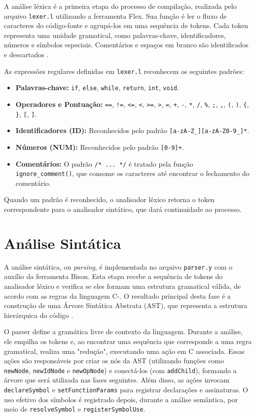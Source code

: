 \documentclass[
	12pt,				%
	oneside,
	a4paper,			%
	english,			%
	french,				%
	spanish,			%
	brazil,				%
	]{abntex2}
\begin{document}
A análise léxica é a primeira etapa do processo de compilação, realizada pelo arquivo \texttt{lexer.l} utilizando a ferramenta Flex. Sua função é ler o fluxo de caracteres do código-fonte e agrupá-los em uma sequência de tokens. Cada token representa uma unidade gramatical, como palavras-chave, identificadores, números e símbolos especiais. Comentários e espaços em branco são identificados e descartados \cite{compiladoresLouden}.

As expressões regulares definidas em \texttt{lexer.l} reconhecem os seguintes padrões:
\begin{itemize}
    \item \textbf{Palavras-chave:} \texttt{if}, \texttt{else}, \texttt{while}, \texttt{return}, \texttt{int}, \texttt{void}.
    \item \textbf{Operadores e Pontuação:} \texttt{==}, \texttt{!=}, \texttt{<=}, \texttt{<}, \texttt{>=}, \texttt{>}, \texttt{=}, \texttt{+}, \texttt{-}, \texttt{*}, \texttt{/}, \texttt{\%}, \texttt{;}, \texttt{,}, \texttt{(}, \texttt{)}, \texttt{\{}, \texttt{\}}, \texttt{[}, \texttt{]}.
    \item \textbf{Identificadores (ID):} Reconhecidos pelo padrão \texttt{[a-zA-Z\_][a-zA-Z0-9\_]*}.
    \item \textbf{Números (NUM):} Reconhecidos pelo padrão \texttt{[0-9]+}.
    \item \textbf{Comentários:} O padrão \texttt{/* ... */} é tratado pela função \texttt{ignore\_comment()}, que consome os caracteres até encontrar o fechamento do comentário.
\end{itemize}
Quando um padrão é reconhecido, o analisador léxico retorna o token correspondente para o analisador sintático, que dará continuidade ao processo.

\section{Análise Sintática}

A análise sintática, ou \emph{parsing}, é implementada no arquivo \texttt{parser.y} com o auxílio da ferramenta Bison. Esta etapa recebe a sequência de tokens do analisador léxico e verifica se eles formam uma estrutura gramatical válida, de acordo com as regras da linguagem C-. O resultado principal desta fase é a construção de uma Árvore Sintática Abstrata (AST), que representa a estrutura hierárquica do código \cite{compiladoresLouden}.

O parser define a gramática livre de contexto da linguagem. Durante a análise, ele empilha os tokens e, ao encontrar uma sequência que corresponde a uma regra gramatical, realiza uma "redução", executando uma ação em C associada. Essas ações são responsáveis por criar os nós da AST (utilizando funções como \texttt{newNode}, \texttt{newIdNode} e \texttt{newOpNode}) e conectá-los (com \texttt{addChild}), formando a árvore que será utilizada nas fases seguintes. Além disso, as ações invocam \texttt{declareSymbol} e \texttt{setFunctionParams} para registrar declarações e assinaturas. O uso efetivo dos símbolos é registrado depois, durante a análise semântica, por meio de \texttt{resolveSymbol} e \texttt{registerSymbolUse}.
\end{document}
